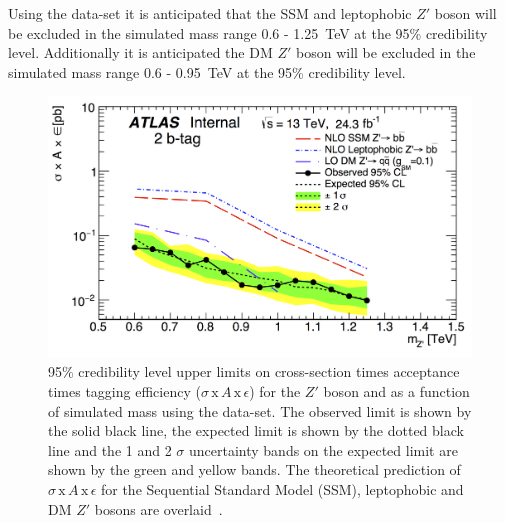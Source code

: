 Using the \lm{} data-set it is anticipated that the SSM and leptophobic $Z'$ boson
will be excluded in the simulated mass range 0.6 - 1.25~TeV at the 95\% credibility level.
Additionally it is anticipated the DM $Z'$ boson will be excluded in the simulated mass range
0.6 - 0.95~TeV  at the 95\% credibility level.

\begin{figure}[!t]
  \centering
  \includegraphics[width=0.9\linewidth, angle=0]{figs/Dibjet/LowMass/lim-lowmass_zprime_mjjcut.png}
  \caption[95\% credibility level upper limits on
           cross-section times acceptance times tagging efficiency
           ($\sigma\,\text{x}\,\mathit{A}\,\text{x}\,\epsilon$)
           for the $Z'$ boson and as a function of simulated mass using the \lm{} data-set.]
          {95\% credibility level upper limits on cross-section times acceptance times tagging efficiency
            ($\sigma\,\text{x}\,\mathit{A}\,\text{x}\,\epsilon$)
             for the $Z'$ boson and as a function of simulated mass using the \lm{} data-set.
             The observed limit is shown by the solid black line, the expected limit is shown by the dotted black line
             and the 1 and 2 $\sigma$ uncertainty bands on the expected limit are shown by the green and yellow bands.
             The theoretical prediction of $\sigma\,\text{x}\,\mathit{A}\,\text{x}\,\epsilon$
             for the Sequential Standard Model (SSM), leptophobic and DM $Z'$ bosons are overlaid~\cite{dibjet-full_int}.}
  \label{fig:lim-lowmass_benchmark}
\end{figure}

